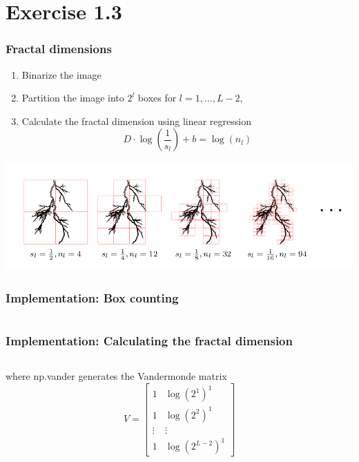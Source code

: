 \documentclass[10pt,aspectratio=169,handout]{beamer}
\begin{document}
\section{Exercise 1.3}

\begin{frame}
    \frametitle{Fractal dimensions}

    \begin{enumerate}
        \item Binarize the image
        \item Partition the image into $2^l$ boxes for $l=1,\dots,L-2$,
        \item Calculate the fractal dimension using linear regression \[D\cdot \log\left(\frac{1}{s_l}\right)+b=\log(n_l)\]
    \end{enumerate}
    \includegraphics[scale=0.4]{images/boxes.png}

\end{frame}

\begin{frame}
    \frametitle{Implementation: Box counting}
    \inputminted[bgcolor=LightGray,fontsize=\small]{python}{box_counting.py}
\end{frame}

\begin{frame}
    \frametitle{Implementation: Calculating the fractal dimension}
    \inputminted[bgcolor=LightGray,fontsize=\small]{python}{get_slope.py}
    where np.vander generates the Vandermonde matrix
    \[V=\begin{bmatrix}
            1      & \log(2^1)^1     \\
            1      & \log(2^2)^1     \\
            \vdots & \vdots          \\
            1      & \log(2^{L-2})^1
        \end{bmatrix}\]
\end{frame}
\end{document}
